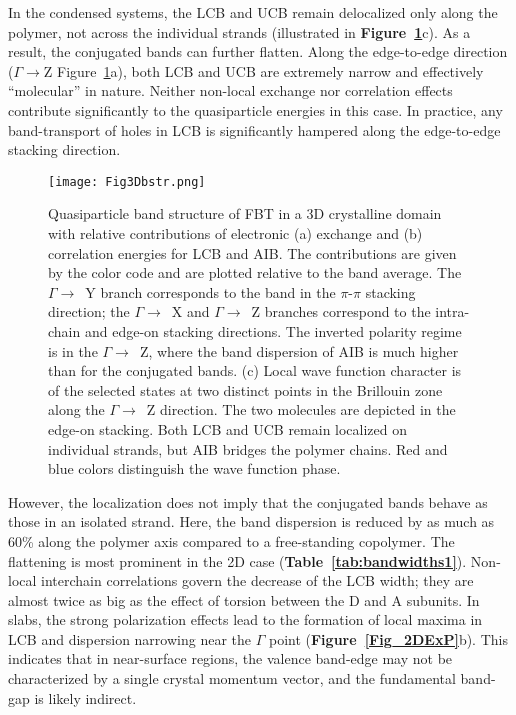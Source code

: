 \documentclass[journal = jpclcd]{achemso}
\begin{document}
In the condensed systems, the LCB and UCB  remain delocalized only along the polymer, not across the individual strands (illustrated in \textbf{Figure~\ref{Fig3Dbstr}}c). As a result, the conjugated bands can further flatten. Along the edge-to-edge direction ($\Gamma \to$Z Figure~\ref{Fig3Dbstr}a), both LCB and UCB are extremely narrow and effectively ``molecular'' in nature. Neither non-local exchange nor correlation effects contribute significantly to the quasiparticle energies in this case. In practice, any band-transport of holes in LCB is significantly hampered  along the edge-to-edge stacking direction. 

\begin{figure}
    \centering
    \texttt{[image: Fig3Dbstr.png]}
    \caption{Quasiparticle band structure of FBT in a 3D crystalline domain with relative contributions of electronic (a) exchange and (b) correlation energies for LCB and AIB.  The contributions are given by the color code and are plotted relative to the band average. The $\Gamma \to$~Y branch corresponds to the band in the $\pi$-$\pi$ stacking direction; the $\Gamma \to$~X and $\Gamma \to$~Z branches correspond to the intra-chain and edge-on stacking directions. The inverted polarity regime is in the $\Gamma\to$~Z, where the band dispersion of AIB is much higher than for the conjugated bands. (c) Local wave function character is of the selected states at two distinct points in the Brillouin zone along the $\Gamma\to$~Z direction. The two molecules are depicted in the edge-on stacking. Both LCB and UCB remain localized on individual strands, but AIB bridges the polymer chains. Red and blue colors distinguish the wave function phase. }
    \label{Fig3Dbstr}
\end{figure}

However, the localization does not imply that the conjugated bands behave as those in an isolated strand.  Here, the band dispersion is reduced by as much as 60\% along the polymer axis compared to a free-standing copolymer. The flattening is most prominent in the 2D case (\textbf{Table~\ref{tab:bandwidths1}}). Non-local interchain correlations govern the decrease of the LCB width; they are almost twice as big as the effect of torsion between the D and A subunits. In slabs, the strong polarization effects lead to the formation of local maxima in LCB and dispersion narrowing near the $\Gamma$ point (\textbf{Figure~\ref{Fig_2DExP}}b). This indicates that in near-surface regions, the valence band-edge may not be characterized by a single crystal momentum vector, and the fundamental band-gap is likely indirect.
\end{document}
